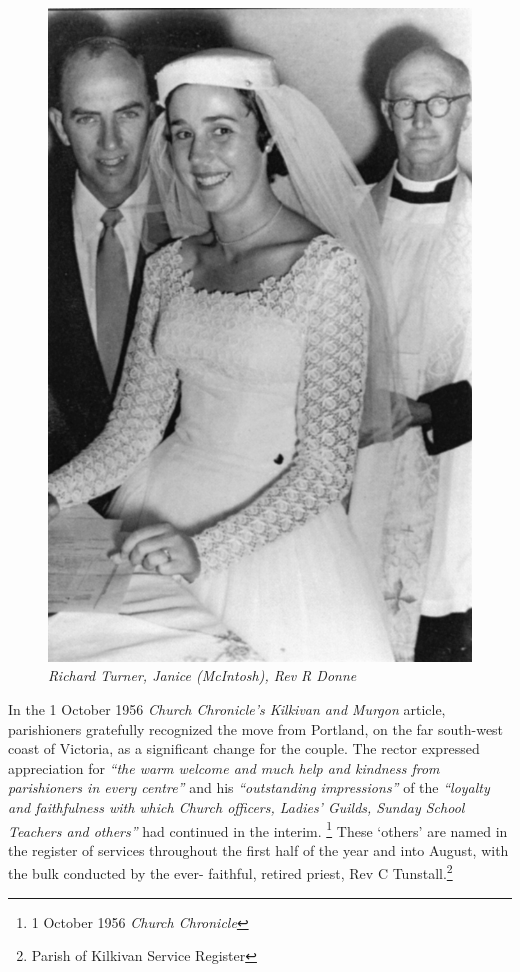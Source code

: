 \begin{figure}
\begin{center}
\includegraphics[width=1.\linewidth,center]{../images/Donne.jpg}
\caption{\itshape Richard Turner, Janice (McIntosh), Rev R Donne}
\end{center}
\end{figure}




In the 1 October 1956 \emph{Church Chronicle's Kilkivan and Murgon} article, parishioners gratefully recognized the move from Portland, on the far south-west coast of Victoria, as a significant change for the couple. The rector expressed appreciation for \emph{``the warm welcome and much help and kindness from parishioners in every centre''} and his \emph{``outstanding impressions''} of the \emph{``loyalty and faithfulness with which Church officers, Ladies' Guilds, Sunday School Teachers and others''} had continued in the interim. \footnote{1 October 1956 \emph{Church Chronicle}} These `others' are named in the register of services throughout the first half of the year and into August, with the bulk conducted by the ever- faithful, retired priest, Rev C Tunstall.\footnote{Parish of Kilkivan Service Register}



